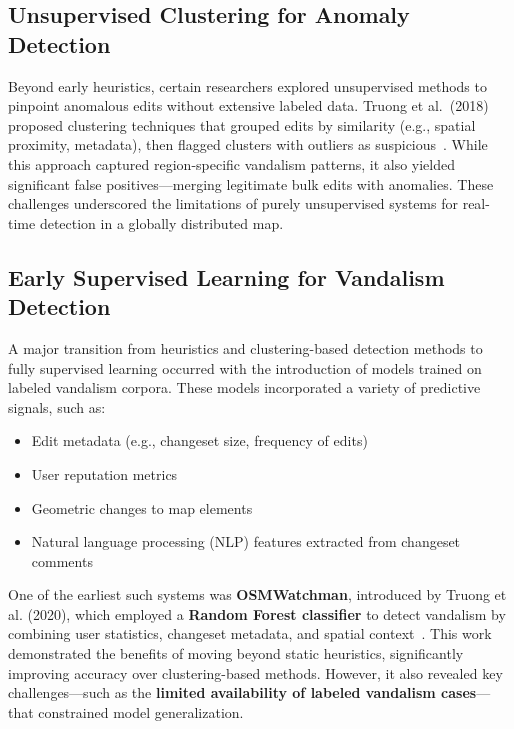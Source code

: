 \documentclass[
    13pt, %
    a4paper, %
    listof=totoc, %
    bibliography=totoc, %
    index=totoc, %
    headsepline
]{scrreprt}
\begin{document}
\subsection{Unsupervised Clustering for Anomaly Detection}
\label{sec:clustering_methods}

Beyond early heuristics, certain researchers explored unsupervised methods to pinpoint anomalous edits without extensive labeled data. Truong et al.\ (2018) proposed clustering techniques that grouped edits by similarity (e.g., spatial proximity, metadata), then flagged clusters with outliers as suspicious~\cite{Truong2018}. While this approach captured region-specific vandalism patterns, it also yielded significant false positives—merging legitimate bulk edits with anomalies. These challenges underscored the limitations of purely unsupervised systems for real-time detection in a globally distributed map.

\subsection{Early Supervised Learning for Vandalism Detection}
\label{sec:transition_to_ml}

A major transition from heuristics and clustering-based detection methods to fully supervised learning occurred with the introduction of models trained on labeled vandalism corpora. These models incorporated a variety of predictive signals, such as:
\begin{itemize}
    \item Edit metadata (e.g., changeset size, frequency of edits)
    \item User reputation metrics
    \item Geometric changes to map elements
    \item Natural language processing (NLP) features extracted from changeset comments
\end{itemize}

One of the earliest such systems was \textbf{OSMWatchman}, introduced by Truong et al. (2020), which employed a \textbf{Random Forest classifier} to detect vandalism by combining user statistics, changeset metadata, and spatial context~\cite{Truong2020}. This work demonstrated the benefits of moving beyond static heuristics, significantly improving accuracy over clustering-based methods. However, it also revealed key challenges—such as the \textbf{limited availability of labeled vandalism cases}—that constrained model generalization.
\end{document}
